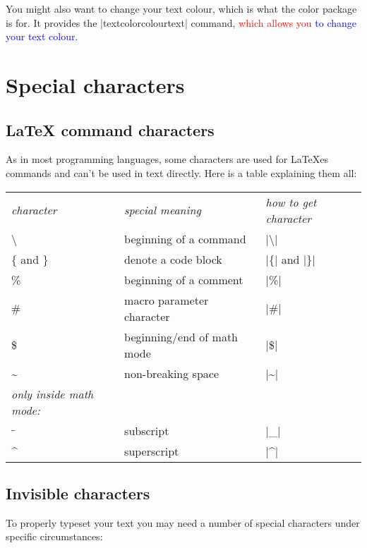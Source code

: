         \medskip
        You might also want to change your text colour, which is what the {color} package is for. It provides the
        |textcolor{colour}{text}| command, \textcolor{red}{which allows you} \textcolor{blue}{to change your text colour}.

        \section{Special characters} \label{sec: special-charaters}
            \subsection{LaTeX command characters}
                As in most programming languages, some characters are used for LaTeXes commands and can't be used in text directly. Here is a table
                explaining them all:

                \smallskip
                \begin{tabular}{l l l}
                    \emph{character} & \emph{special meaning} & \emph{how to get character} \\
                    \textbackslash & beginning of a command & |\textbackslash| \\
                    \{ and \} & denote a code block & |\{| and |\}|\\
                    \% & beginning of a comment & |\%| \\
                    \# & macro parameter character & |\#| \\
                    \$ & beginning/end of math mode & |\$| \\
                    \textasciitilde & non-breaking space & |\textasciitilde| \\
                    \emph{only inside math mode:} \\
                    $\_$ & subscript & |\_| \\
                    \textasciicircum & superscript & |\textasciicircum| \\
                \end{tabular}

            \subsection{Invisible characters}
                To properly typeset your text you may need a number of special characters under specific circumstances:

